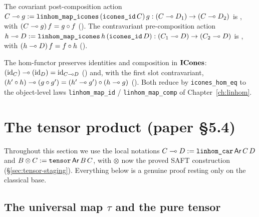 \begin{definition}\label{def:linhom-onesided}
\rocqok
{}\rocqok
{}
The covariant post-composition action $C \multimap g :=
\texttt{linhom\_map\_icones}\,(\texttt{icones\_id}\,C)\,g : (C \multimap
D_1) \to (C \multimap D_2)$ is
, with
$(C \multimap g)\,f = g \circ f$
(). The
contravariant pre-composition action $h \multimap D :=
\texttt{linhom\_map\_icones}\,h\,(\texttt{icones\_id}\,D) : (C_1 \multimap
D) \to (C_2 \multimap D)$ is
, with
$(h \multimap D)\,f = f \circ h$
().
\end{definition}

\begin{lemma}\label{lem:linhom-functoriality}
\rocqok
{}\rocqok
{}
The hom-functor preserves identities and composition in $\mathbf{ICones}$:
$(\mathrm{id}_C) \multimap (\mathrm{id}_D) = \mathrm{id}_{C \multimap D}$
() and, with
the first slot contravariant,
$(h' \circ h) \multimap (g \circ g') = (h' \multimap g') \circ (h \multimap g)$
(). Both
reduce by \texttt{icones\_hom\_eq} to the object-level laws
\texttt{linhom\_map\_id} / \texttt{linhom\_map\_comp} of
Chapter~\ref{ch:linhom}.
\end{lemma}

\section{The tensor product (paper \S5.4)}\label{sec:tensor-build}

Throughout this section we use the local notations $C \multimap D :=
\texttt{linhom\_car}\,\mathsf{Ar}\,C\,D$ and $B \otimes C := \texttt{tensor}\,\mathsf{Ar}\,B\,C$,
with $\otimes$ now the proved SAFT construction
(\S\ref{sec:tensor-staging}). Everything below is a genuine proof
resting only on the classical base.

\subsection{The universal map \texorpdfstring{$\tau$}{tau} and the pure tensor}%
\label{sec:tau}

